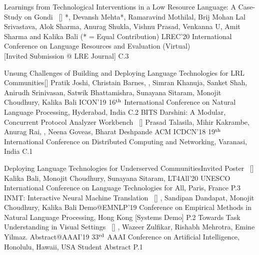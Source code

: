 \begin{publications}

\publication
    {Learnings from Technological Interventions in a Low Resource Language: A Case-Study on Gondi}{~ [\href{https://www.aclweb.org/anthology/2020.lrec-1.345/}{\small{\linkSymbol}}]}
    {\underline{}*, Devansh Mehta*, Ramaravind Mothilal, Brij Mohan Lal Srivastava, Alok Sharma, Anurag Shukla, Vishnu Prasad, Venkanna U, Amit Sharma and Kalika Bali \small{(* = Equal Contribution)}}
	{LREC'20} {International Conference on Language Resources and Evaluation (Virtual) \\ {{[Invited Submission @ LRE Journal]}}} {C.3}

\publication 
    {Unsung Challenges of Building and Deploying Language Technologies for LRL Communities}{[\href{https://arxiv.org/abs/1912.03457}{\small{\linkSymbol}}]}
    {Pratik Joshi, Christain Barnes, \underline{}, Simran Khanuja, Sanket Shah, Anirudh Srinivasan, Satwik Bhattamishra, Sunayana Sitaram, Monojit Choudhury, Kalika Bali}
	{ICON'19} {16$^{\textrm{\scriptsize th}}$ International Conference on Natural Language Processing, Hyderabad, India} {C.2}
\publication
	{BITS Darshini: A Modular, Concurrent Protocol Analyzer Workbench}{~ [\href{https://dl.acm.org/doi/10.1145/3154273.3154316}{\small{\linkSymbol}}]}
	{Prasad Talasila, Mihir Kakrambe, Anurag Rai, \underline{}, Neena Goveas, Bharat Deshpande}
	{ACM ICDCN'18} {19$^{\textrm{\scriptsize th}}$ International Conference on Distributed Computing and Networking, Varanasi, India} {C.1}
	
	
\publication
    {Deploying Language Technologies for Underserved Communities}{\lbrack Invited Poster\rbrack ~ [\href{https://lt4all.elra.info/media/papers/P5/65.html}{\small{\linkSymbol}}]}
    {Kalika Bali, Monojit Choudhury, Sunayana Sitaram, \underline{}}
	{LT4All'20} {UNESCO International Conference on Language Technologies for All, Paris, France} {P.3}
\publication
    {INMT: Interactive Neural Machine Translation}{~ [\href{https://www.aclweb.org/anthology/D19-3018/}{\small{\linkSymbol}}]}
	{\underline{}, Sandipan Dandapat, Monojit Choudhury, Kalika Bali}
	{Demo@EMNLP'19} {Conference on Empirical Methods in Natural Language Processing, Hong Kong [Systems Demo]} {P.2}
\publication
	{Towards Task Understanding in Visual Settings}{~ [\href{https://arxiv.org/abs/1811.11833}{\small{\linkSymbol}}]}
	{\underline{}, Wazeer Zulfikar, Rishabh Mehrotra, Emine Yilmaz.}
	{Abstract@AAAI'19} {33$^{\textrm{\scriptsize rd}}$ AAAI Conference on Artificial Intelligence, Honolulu, Hawaii, USA \lbrack Student Abstract\rbrack} {P.1}
	

\end{publications}
